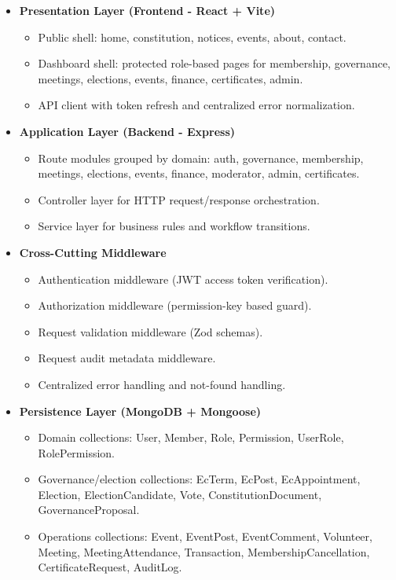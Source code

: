 \documentclass[12pt,a4paper]{article}
\begin{document}
\begin{itemize}[noitemsep]
  \item \textbf{Presentation Layer (Frontend - React + Vite)}
  \begin{itemize}[noitemsep]
    \item Public shell: home, constitution, notices, events, about, contact.
    \item Dashboard shell: protected role-based pages for membership, governance, meetings, elections, events, finance, certificates, admin.
    \item API client with token refresh and centralized error normalization.
  \end{itemize}

  \item \textbf{Application Layer (Backend - Express)}
  \begin{itemize}[noitemsep]
    \item Route modules grouped by domain: auth, governance, membership, meetings, elections, events, finance, moderator, admin, certificates.
    \item Controller layer for HTTP request/response orchestration.
    \item Service layer for business rules and workflow transitions.
  \end{itemize}

  \item \textbf{Cross-Cutting Middleware}
  \begin{itemize}[noitemsep]
    \item Authentication middleware (JWT access token verification).
    \item Authorization middleware (permission-key based guard).
    \item Request validation middleware (Zod schemas).
    \item Request audit metadata middleware.
    \item Centralized error handling and not-found handling.
  \end{itemize}

  \item \textbf{Persistence Layer (MongoDB + Mongoose)}
  \begin{itemize}[noitemsep]
    \item Domain collections: User, Member, Role, Permission, UserRole, RolePermission.
    \item Governance/election collections: EcTerm, EcPost, EcAppointment, Election, ElectionCandidate, Vote, ConstitutionDocument, GovernanceProposal.
    \item Operations collections: Event, EventPost, EventComment, Volunteer, Meeting, MeetingAttendance, Transaction, MembershipCancellation, CertificateRequest, AuditLog.
  \end{itemize}
\end{itemize}
\end{document}
